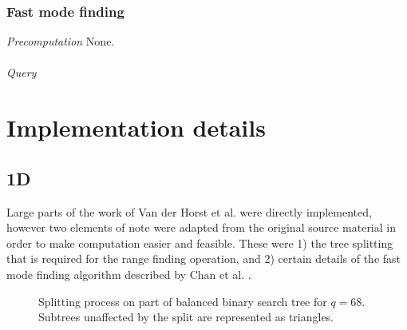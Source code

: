 \documentclass{article}
\begin{document}
\subsubsection{Fast mode finding}
\textit{Precomputation} None. \\\\
\textit{Query} 
\section{Implementation details}
\subsection{1D}
Large parts of the work of Van der Horst et al. \cite{vanderhorst_et_al:LIPIcs.ESA.2022.67} were directly implemented, however two elements of note were adapted from the original source material in order to make computation easier and feasible. These were 1) the tree splitting that is required for the range finding operation, and 2) certain details of the fast mode finding algorithm described by Chan et al. \cite{Chan2014}.
\begin{figure}%
    \centering
    \qquad
    \caption{Splitting process on part of balanced binary search tree for $q=68$. Subtrees unaffected by the split are represented as triangles.}%
    \label{fig:example}%
\end{figure}
\end{document}
